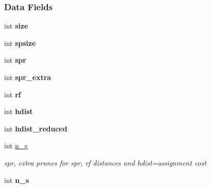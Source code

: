 \subsubsection*{Data Fields}
\begin{DoxyCompactItemize}
\item 
\mbox{\label{structsplitset__struct_af0d4564c44bcaff08461fe7bec1bbe13}} 
int {\bfseries size}
\item 
\mbox{\label{structsplitset__struct_a2b389f9524f0c01831ebd72f60a05939}} 
int {\bfseries spsize}
\item 
\mbox{\label{structsplitset__struct_afaff8951790761f96cb3da25c3493790}} 
int {\bfseries spr}
\item 
\mbox{\label{structsplitset__struct_aa6b2ef3d64746cf55e830f9e43d06ed9}} 
int {\bfseries spr\+\_\+extra}
\item 
\mbox{\label{structsplitset__struct_a10f8784951d4a3adc62e1666a5caeebb}} 
int {\bfseries rf}
\item 
\mbox{\label{structsplitset__struct_a39b0070a47fbf625a3d1b5cbbf36f113}} 
int {\bfseries hdist}
\item 
\mbox{\label{structsplitset__struct_a30caa7dd87e5e99aec92b2fd48cb71f4}} 
int {\bfseries hdist\+\_\+reduced}
\item 
\mbox{\label{structsplitset__struct_af7ba4428e2049a8f8c50215fc8c9e3b5}} 
int \hyperlink{structsplitset__struct_af7ba4428e2049a8f8c50215fc8c9e3b5}{n\+\_\+g}
\begin{DoxyCompactList}\small\item\em spr, extra prunes for spr, rf distances and hdist=assignment cost \end{DoxyCompactList}\item 
\mbox{\label{structsplitset__struct_a7b08d1b651b28e889650095b180bfd16}} 
int {\bfseries n\+\_\+s}
\item 
\mbox{\label{structsplitset__struct_ada9ed313c4a36897b613f54cf9870d10}} 

\end{DoxyCompactItemize}
